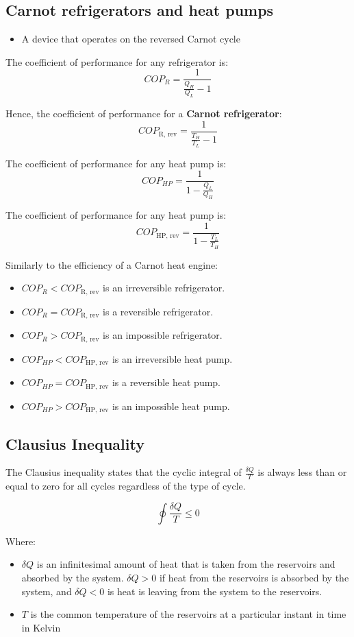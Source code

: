 \documentclass[11pt]{article}
\begin{document}
\subsection{Carnot refrigerators and heat pumps}
\label{sec:org87f134b}
\begin{itemize}
\item A device that operates on the reversed Carnot cycle
\end{itemize}

The coefficient of performance for any refrigerator is:
\[COP_R = \frac{1}{\frac{Q_H}{Q_L} - 1}\]

Hence, the coefficient of performance for a \textbf{Carnot refrigerator}:
\[COP_{\text{R, rev}} = \frac{1}{\frac{T_H}{T_L} - 1}\]

The coefficient of performance for any heat pump is:
\[COP_{HP} = \frac{1}{1 - \frac{Q_L}{Q_H}}\]

The coefficient of performance for any heat pump is:
\[COP_{\text{HP, rev}} = \frac{1}{1 - \frac{T_L}{T_H}}\]

Similarly to the efficiency of a Carnot heat engine:
\begin{itemize}
\item \(COP_{R} < COP_{\text{R, rev}}\) is an irreversible refrigerator.
\item \(COP_{R} = COP_{\text{R, rev}}\) is a reversible refrigerator.
\item \(COP_{R} > COP_{\text{R, rev}}\) is an impossible refrigerator.
\item \(COP_{HP} < COP_{\text{HP, rev}}\) is an irreversible heat pump.
\item \(COP_{HP} = COP_{\text{HP, rev}}\) is a reversible heat pump.
\item \(COP_{HP} > COP_{\text{HP, rev}}\) is an impossible heat pump.
\end{itemize}

 \newpage

\subsection{Clausius Inequality}
\label{sec:org5552b98}
The Clausius inequality states that the cyclic integral of \(\frac{\delta Q}{T}\) is always less than or equal to zero for all cycles regardless of the type of cycle.

\[\oint \frac{\delta Q}{T} \leq 0\]

Where:
\begin{itemize}
\item \(\delta Q\) is an infinitesimal amount of heat that is taken from the reservoirs and absorbed by the system. \(\delta Q > 0\) if heat from the reservoirs is absorbed by the system, and \(\delta Q < 0\) is heat is leaving from the system to the reservoirs.
\item \(T\) is the common temperature of the reservoirs at a particular instant in time in Kelvin
\end{itemize}
\end{document}
